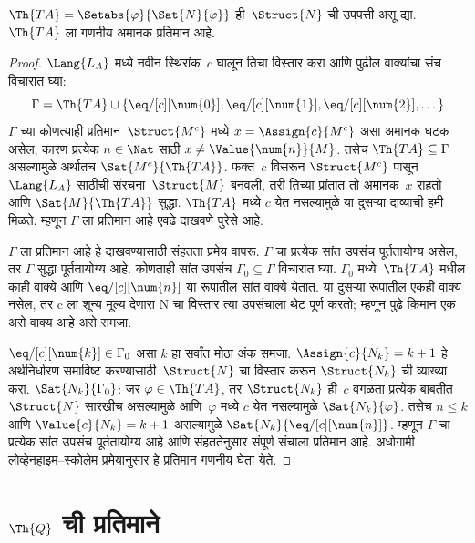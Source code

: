 \begin{prop}
$\Th{TA} = \Setabs{\varphi}{\Sat{N}{\varphi}}$ ही~$\Struct{N}$ ची उपपत्ती असू द्या.
$\Th{TA}$ ला गणनीय अमानक प्रतिमान आहे.
\end{prop}

\begin{proof}
$\Lang{L_A}$ मध्ये नवीन स्थिरांक~$c$ घालून तिचा विस्तार करा आणि
पुढील वाक्यांचा संच विचारात घ्या:
\[\Gamma = \Th{TA} \cup \{\eq/[c][\num{0}], \eq/[c][\num{1}],
\eq/[c][\num{2}], \dots\}
\]
$\Gamma$ च्या कोणत्याही प्रतिमान~$\Struct{M^c}$ मध्ये
$x = \Assign{c}{M^c}$ असा अमानक घटक असेल, कारण प्रत्येक
$n \in \Nat$ साठी $x \neq \Value{\num{n}}{M}$. तसेच
$\Th{TA} \subseteq \Gamma$ असल्यामुळे अर्थातच $\Sat{M^c}{\Th{TA}}$.
फक्त~$c$ विसरून $\Struct{M^c}$ पासून $\Lang{L_A}$ साठीची
संरचना~$\Struct{M}$ बनवली, तरी तिच्या प्रांतात तो अमानक~$x$ राहतो
आणि $\Sat{M}{\Th{TA}}$ सुद्धा. $\Th{TA}$ मध्ये $c$ येत नसल्यामुळे या
दुसऱ्या दाव्याची हमी मिळते. म्हणून $\Gamma$ ला प्रतिमान आहे एवढे दाखवणे
पुरेसे आहे.


$\Gamma$ ला प्रतिमान आहे हे दाखवण्यासाठी संहतता प्रमेय वापरू. $\Gamma$ चा
प्रत्येक सांत उपसंच पूर्ततायोग्य असेल, तर $\Gamma$ सुद्धा पूर्ततायोग्य आहे.
कोणताही सांत उपसंच $\Gamma_0 \subseteq \Gamma$ विचारात घ्या.
$\Gamma_0$ मध्ये~$\Th{TA}$ मधील काही वाक्ये आणि
$\eq/[c][\num{n}]$ या रूपातील सांत वाक्ये येतात. या दुसऱ्या रूपातील एकही
वाक्य नसेल, तर c ला शून्य मूल्य देणारा N चा विस्तार त्या उपसंचाला थेट
पूर्ण करतो; म्हणून पुढे किमान एक असे वाक्य आहे असे समजा.

$\eq/[c][\num{k}] \in \Gamma_0$ असा $k$ हा सर्वांत मोठा अंक समजा.
$\Assign{c}{N_k} = k+1$ हे अर्थनिर्धारण समाविष्ट करण्यासाठी~$\Struct{N}$
चा विस्तार करून $\Struct{N_k}$ ची व्याख्या करा. $\Sat{N_k}{\Gamma_0}$:
जर $\varphi \in \Th{TA}$, तर $\Struct{N_k}$ ही~$c$ वगळता प्रत्येक बाबतीत
$\Struct{N}$ सारखीच असल्यामुळे आणि~$\varphi$ मध्ये $c$ येत नसल्यामुळे
$\Sat{N_k}{\varphi}$. तसेच $n \le k$ आणि $\Value{c}{N_k} = k+1$ असल्यामुळे
$\Sat{N_k}{\eq/[c][\num{n}]}$. म्हणून $\Gamma$ चा प्रत्येक सांत उपसंच
पूर्ततायोग्य आहे आणि संहततेनुसार संपूर्ण संचाला प्रतिमान आहे. अधोगामी
लोव्हेनहाइम--स्कोलेम प्रमेयानुसार हे प्रतिमान गणनीय घेता येते.

\end{proof}











\section{$\Th{Q}$ ची प्रतिमाने}\label{mod:mar:mdq:sec}

